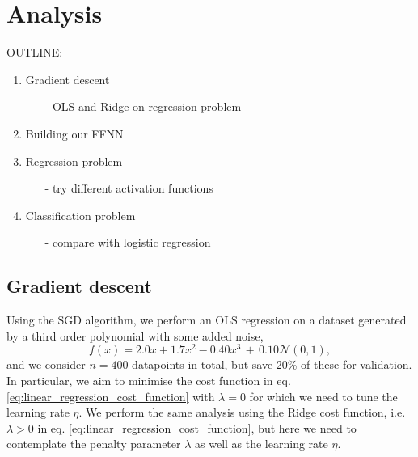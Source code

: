 \section{Analysis}\label{sec:analysis}





OUTLINE:
\begin{enumerate}
    \item Gradient descent \begin{enumerate}
        \item[-] OLS and Ridge on regression problem
    \end{enumerate}
    \item Building our FFNN
    \item Regression problem \begin{enumerate}
        \item[-] try different activation functions
    \end{enumerate}
    \item Classification problem \begin{enumerate}
        \item[-] compare with logistic regression 
    \end{enumerate}
\end{enumerate}

\subsection{Gradient descent}\label{sec:analysis_SGD}


    Using the SGD algorithm, we perform an OLS regression on a dataset generated by a third order polynomial with some added noise,
    \begin{equation}
        f(x) = 2.0x + 1.7x^2 -0.40x^3 \, +\, 0.10\mathcal{N}(0, 1),
    \end{equation}
    and we consider $n=400$ datapoints in total, but save 20\% of these for validation. In particular, we aim to minimise the cost function in eq. \eqref{eq:linear_regression_cost_function} with $\lambda=0$ for which we need to tune the learning rate $\eta$. We perform the same analysis using the Ridge cost function, i.e. $\lambda > 0$ in eq. \eqref{eq:linear_regression_cost_function}, but here we need to contemplate the penalty parameter $\lambda$ as well as the learning rate $\eta$. 

